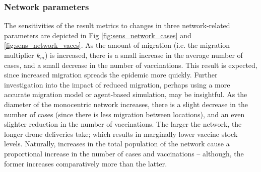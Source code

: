 \documentclass[10pt,letterpaper]{article}
\begin{document}
\subsubsection*{Network parameters}
The sensitivities of the result metrics to changes in three network-related parameters are depicted in Fig \ref{fig:sens_network_cases} and \ref{fig:sens_network_vaccs}.
As the amount of migration (i.e. the migration multiplier $k_{m}$) is increased, there is a small increase in the average number of cases, and a small decrease in the number of vaccinations. This result is expected, since increased migration spreads the epidemic more quickly. Further investigation into the impact of reduced migration, perhaps using a more accurate migration model or agent-based simulation, may be insightful.
As the diameter of the monocentric network increases, there is a slight decrease in the number of cases (since there is less migration between locations), and an even slighter reduction in the number of vaccinations. The larger the network, the longer drone deliveries take; which results in marginally lower vaccine stock levels.
Naturally, increases in the total population of the network cause a proportional increase in the number of cases and vaccinations -- although, the former increases comparatively more than the latter.
\end{document}
